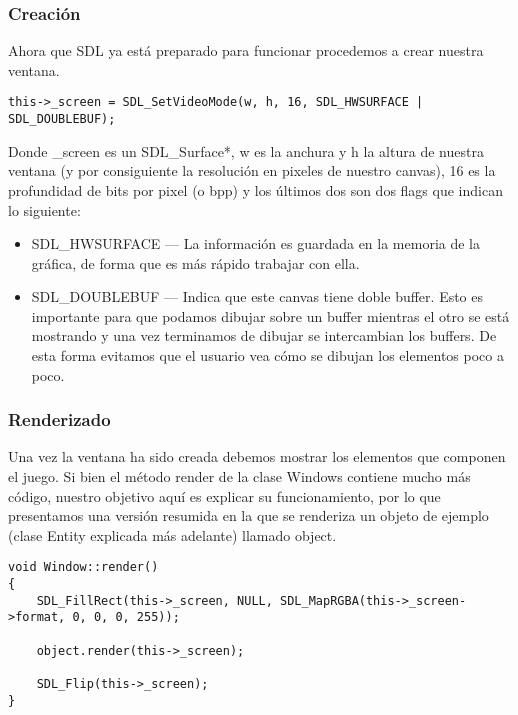 \documentclass[parskip=half*]{scrartcl}
\begin{document}
			\subsubsection{Creaci\'on}
				Ahora que SDL ya est\'a preparado para funcionar procedemos a crear nuestra ventana.

				\begin{lstlisting}
this->_screen = SDL_SetVideoMode(w, h, 16, SDL_HWSURFACE | SDL_DOUBLEBUF);
				\end{lstlisting}

				Donde \_screen es un SDL\_Surface*, w es la anchura y h la altura de nuestra ventana (y por consiguiente la resoluci\'on en pixeles de nuestro canvas), 16 es la profundidad de bits por pixel (o bpp) y los últimos dos son dos flags que indican lo siguiente:

				\begin{itemize}
					\item SDL\_HWSURFACE --- La informaci\'on es guardada en la memoria de la gr\'afica, de forma que es m\'as r\'apido trabajar con ella.

					\item SDL\_DOUBLEBUF --- Indica que este canvas tiene doble buffer. Esto es importante para que podamos dibujar sobre un buffer mientras el otro se est\'a mostrando y una vez terminamos de dibujar se intercambian los buffers. De esta forma evitamos que el usuario vea c\'omo se dibujan los elementos poco a poco.
				\end{itemize}

			\subsubsection{Renderizado}
				Una vez la ventana ha sido creada debemos mostrar los elementos que componen el juego. Si bien el m\'etodo render de la clase Windows contiene mucho m\'as c\'odigo, nuestro objetivo aqu\'i es explicar su funcionamiento, por lo que presentamos una versi\'on resumida en la que se renderiza un objeto de ejemplo (clase Entity explicada m\'as adelante) llamado object.

				\begin{lstlisting}
void Window::render()
{
    SDL_FillRect(this->_screen, NULL, SDL_MapRGBA(this->_screen->format, 0, 0, 0, 255));

    object.render(this->_screen);
    
    SDL_Flip(this->_screen);
}
				\end{lstlisting}
\end{document}
